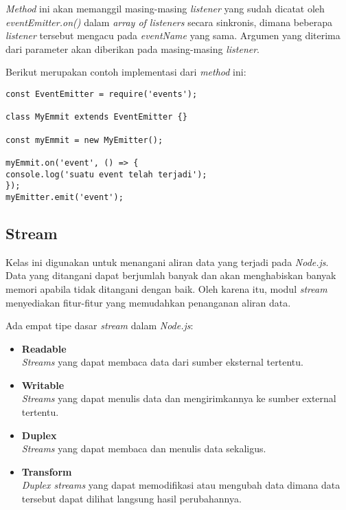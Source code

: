 \begin{itemize}
	\textit{Method} ini akan memanggil masing-masing \textit{listener} yang sudah dicatat oleh \textit{eventEmitter.on()} dalam \textit{array of listeners} secara sinkronis, dimana beberapa \textit{listener} tersebut mengacu pada \textit{eventName} yang sama. Argumen yang diterima dari parameter akan diberikan pada masing-masing \textit{listener}.
	
	Berikut merupakan contoh implementasi dari \textit{method} ini:
\begin{lstlisting}
const EventEmitter = require('events');
	
class MyEmmit extends EventEmitter {}
	
const myEmmit = new MyEmitter();
	
myEmmit.on('event', () => {
console.log('suatu event telah terjadi');	
});
myEmitter.emit('event');
\end{lstlisting} 
\end{itemize}

\subsection{Stream}
Kelas ini digunakan untuk menangani aliran data yang terjadi pada \textit{Node.js}. Data yang ditangani dapat berjumlah banyak dan akan menghabiskan banyak memori apabila tidak ditangani dengan baik. Oleh karena itu, modul \textit{stream} menyediakan fitur-fitur yang memudahkan penanganan aliran data.

Ada empat tipe dasar \textit{stream} dalam \textit{Node.js}:
\begin{itemize}
	\item \textbf{Readable} \\ \textit{Streams} yang dapat membaca data dari sumber eksternal tertentu.
	\item \textbf{Writable} \\ \textit{Streams} yang dapat menulis data dan mengirimkannya ke sumber external tertentu.
	\item \textbf{Duplex} \\ \textit{Streams} yang dapat membaca dan menulis data sekaligus.
	\item \textbf{Transform} \\ \textit{Duplex streams} yang dapat memodifikasi atau mengubah data dimana data tersebut dapat dilihat langsung hasil perubahannya.
\end{itemize}

